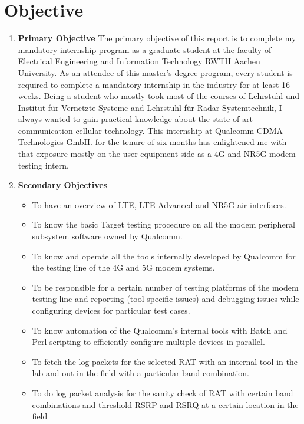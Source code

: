 \chapter{Objective}
\begin{enumerate}
  \item \textbf{Primary Objective} The primary objective of this report is to complete my mandatory internship program as a graduate student at the faculty of  Electrical Engineering and Information Technology RWTH Aachen University. As an attendee of this master's degree program, every student is required to complete a mandatory internship in the industry for at least 16 weeks. Being a student who mostly took most of the courses of Lehrstuhl und Institut für Vernetzte Systeme and Lehrstuhl für Radar-Systemtechnik, I always wanted to gain practical knowledge about the state of art communication cellular technology. This internship at Qualcomm CDMA Technologies GmbH. for the tenure of six months has enlightened me with that exposure mostly on the user equipment side as a 4G and NR5G modem testing intern.
  \item \textbf{Secondary Objectives}
        \begin{itemize}
            \item To have an overview of LTE, LTE-Advanced and NR5G air interfaces.
            \item To know the basic Target testing procedure on all the modem peripheral subsystem software owned by Qualcomm.
            \item To know and operate all the tools internally developed by Qualcomm for the testing line of the 4G and 5G modem systems.
            \item To be responsible for a certain number of testing platforms of the modem testing line and reporting (tool-specific issues) and debugging issues while configuring devices for particular test cases.
            \item To know automation of the Qualcomm's internal tools with Batch and Perl scripting to efficiently configure multiple devices in parallel.
            \item To fetch the log packets for the selected RAT with an internal tool in the lab and out in the field with a particular band combination.
            \item To do log packet analysis for the sanity check of RAT with certain band combinations and threshold RSRP and RSRQ at a certain location in the field
        \end{itemize}

\end{enumerate}
